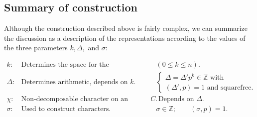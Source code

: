 \documentclass[12pt,reqno]{amsart}
\theoremstyle{remark}
\numberwithin{table}{section}
\newcommand{\Z}{\mathbb Z}
\begin{document}
%

 \subsection{Summary of construction}
 Although the construction described above is fairly complex,  we can summarize the discussion as a description of the representations according to the values of the three parameters $k,\Delta ,$ and $\sigma$:

$$\begin{array}{lll}
k: & \mbox{Determines the space for the representation.} &  ( 0 \leq k \leq n).\\
\Delta: &  \mbox{Determines arithmetic, depends on }k.  &  \left\{\begin{array}{l} \Delta = \Delta' p^k \in \Z \mbox{ with }\\  (\Delta', p) =1 \mbox{ and squarefree.}\end{array}\right. \\
\chi: & \mbox{Non-decomposable character on an abelian group } C. & \mbox{ Depends on }\Delta .\\
\sigma: &  \mbox{Used to construct characters. } & \sigma \in \Z ;   \qquad (\sigma, p) = 1.
\end{array}$$
\end{document}
